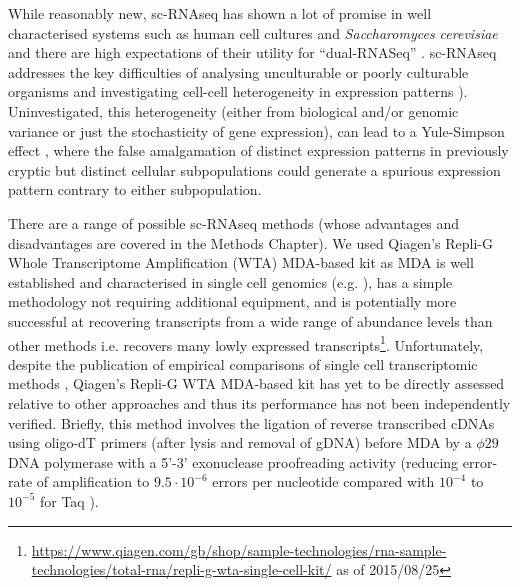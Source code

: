 While reasonably new, sc-RNAseq has shown a lot of promise in well characterised systems such as human cell cultures \citep{Bengtsson2005,Shalek2013}
and \textit{Saccharomyces cerevisiae} \citep{Lipson2009} and there are high expectations
of their utility for ``dual-RNASeq'' \citep{Westermann2012}.  sc-RNAseq addresses 
the key difficulties of analysing unculturable or poorly culturable organisms \citep{Murray2012} and investigating
cell-cell heterogeneity in expression patterns \citep{Raj2008,Shalek2013}).  
Uninvestigated, this heterogeneity (either from biological and/or genomic variance or just the stochasticity of gene expression),
can lead to a Yule-Simpson effect \citep{Yule1903a,Simpson1951}, where the false amalgamation of distinct expression patterns
in previously cryptic but distinct cellular subpopulations could generate a spurious expression pattern contrary to either subpopulation.


There are a range of possible sc-RNAseq methods (whose advantages and disadvantages are covered in the Methods Chapter).
We used Qiagen's Repli-G Whole Transcriptome Amplification (WTA) MDA-based kit as MDA 
is well established and characterised in single cell genomics (e.g. \citet{Spits2006}), 
has a simple methodology not requiring additional equipment, and is potentially more successful at
recovering transcripts from a wide range of abundance levels than other methods i.e. recovers many lowly expressed transcripts\footnote{\url{https://www.qiagen.com/gb/shop/sample-technologies/rna-sample-technologies/total-rna/repli-g-wta-single-cell-kit/} as of 2015/08/25}.
Unfortunately, despite the publication of empirical comparisons of single cell transcriptomic methods \citep{Wu2014a}, 
Qiagen's Repli-G WTA MDA-based kit has yet to be directly assessed relative to other approaches and thus its performance has not
been independently verified. 
Briefly, this method involves the ligation of reverse transcribed cDNAs using oligo-dT primers (after lysis and 
removal of gDNA) before MDA by a \(\phi29\) DNA polymerase with a 5'-3' exonuclease proofreading activity \citep{Korfhage2015}
(reducing error-rate of amplification to \(9.5\cdot10^{-6}\) errors per nucleotide \citep{Paez2004} compared with
\(10^{-4}\) to \(10^{-5}\) for Taq \citep{Tindall1988,Eckert1990}).



